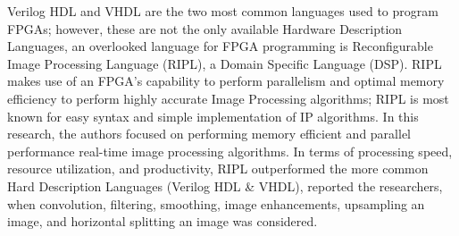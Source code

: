 \par	Verilog HDL and VHDL are the two most common languages used to program FPGAs; however, these are not the only available Hardware Description Languages, an overlooked language for FPGA programming is Reconfigurable Image Processing Language (RIPL), a Domain Specific Language (DSP). RIPL makes use of an FPGA's capability to perform parallelism and optimal memory efficiency to perform highly accurate Image Processing algorithms; RIPL is most known for easy syntax and simple implementation of IP algorithms. In this \cite{twenty_one} research, the authors focused on performing memory efficient and parallel performance real-time image processing algorithms. In terms of processing speed, resource utilization, and productivity, RIPL outperformed the more common Hard Description Languages (Verilog HDL \& VHDL), reported the researchers, when convolution, filtering, smoothing, image enhancements, upsampling an image, and horizontal splitting an image was considered. \newline

